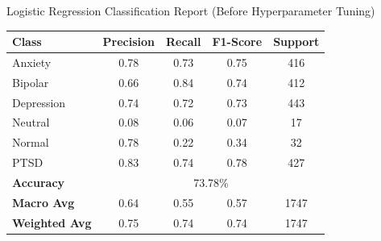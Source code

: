 \begin{center}
    Logistic Regression Classification Report (Before Hyperparameter Tuning) \\
\begin{tabular}{|l|c|c|c|c|}
\hline
\textbf{Class} & \textbf{Precision} & \textbf{Recall} & \textbf{F1-Score} & \textbf{Support} \\ \hline
Anxiety        & 0.78               & 0.73            & 0.75              & 416              \\ \hline
Bipolar        & 0.66               & 0.84            & 0.74              & 412              \\ \hline
Depression     & 0.74               & 0.72            & 0.73              & 443              \\ \hline
Neutral        & 0.08               & 0.06            & 0.07              & 17               \\ \hline
Normal         & 0.78               & 0.22            & 0.34              & 32               \\ \hline
PTSD           & 0.83               & 0.74            & 0.78              & 427              \\ \hline
\textbf{Accuracy} & \multicolumn{4}{|c|}{73.78\%} \\ \hline
\textbf{Macro Avg} & 0.64            & 0.55            & 0.57              & 1747             \\ \hline
\textbf{Weighted Avg} & 0.75         & 0.74            & 0.74              & 1747             \\ \hline
\end{tabular} \\

 \vspace{0.25in}%


\end{center}
